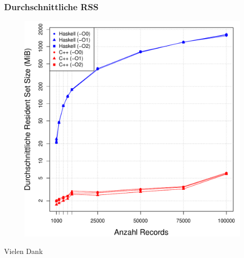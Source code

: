 \documentclass[presentation, shownotes]{beamer}
\begin{document}
\begin{frame}
\frametitle{Durchschnittliche RSS}
    \begin{figure}
    \centering
    \includegraphics[height=.8\textheight]{average_rss_desktop.pdf}
    \end{figure}
\end{frame}

\begin{frame}
\centering
\Huge{Vielen Dank}
\end{frame}
\end{document}
